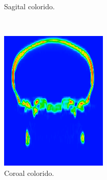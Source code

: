 \documentclass{article}
\begin{document}
\begin{figure}
\begin{subfigure}[b]{0.3\textwidth}
        \caption{Sagital colorido.}
    \end{subfigure}
    ~
    \begin{subfigure}[b]{0.3\textwidth}
        \includegraphics[width=\textwidth]{skull/radiologist-coronal.png}
        \caption{Coroal colorido.}
    \end{subfigure}
    ~
    \begin{subfigure}[b]{0.3\textwidth}

\end{subfigure}
\end{figure}
\end{document}

